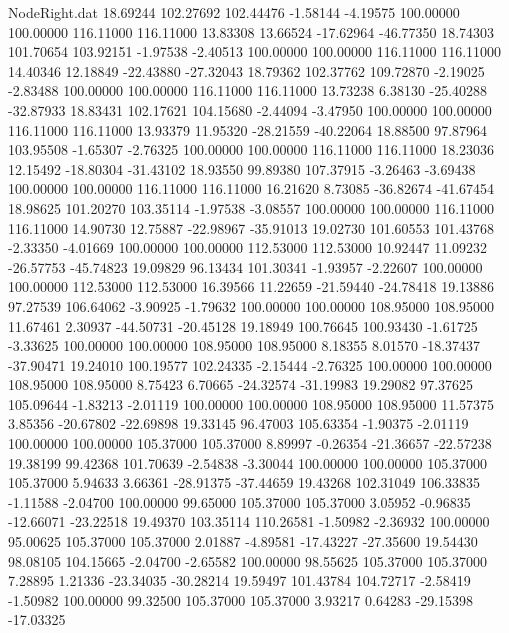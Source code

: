 \begin{filecontents}{NodeRight.dat}
  18.69244  102.27692  102.44476    -1.58144   -4.19575  100.00000  100.00000  116.11000  116.11000   13.83308   13.66524  -17.62964  -46.77350
  18.74303  101.70654  103.92151    -1.97538   -2.40513  100.00000  100.00000  116.11000  116.11000   14.40346   12.18849  -22.43880  -27.32043
  18.79362  102.37762  109.72870    -2.19025   -2.83488  100.00000  100.00000  116.11000  116.11000   13.73238    6.38130  -25.40288  -32.87933
  18.83431  102.17621  104.15680    -2.44094   -3.47950  100.00000  100.00000  116.11000  116.11000   13.93379   11.95320  -28.21559  -40.22064
  18.88500   97.87964  103.95508    -1.65307   -2.76325  100.00000  100.00000  116.11000  116.11000   18.23036   12.15492  -18.80304  -31.43102
  18.93550   99.89380  107.37915    -3.26463   -3.69438  100.00000  100.00000  116.11000  116.11000   16.21620    8.73085  -36.82674  -41.67454
  18.98625  101.20270  103.35114    -1.97538   -3.08557  100.00000  100.00000  116.11000  116.11000   14.90730   12.75887  -22.98967  -35.91013
  19.02730  101.60553  101.43768    -2.33350   -4.01669  100.00000  100.00000  112.53000  112.53000   10.92447   11.09232  -26.57753  -45.74823
  19.09829   96.13434  101.30341    -1.93957   -2.22607  100.00000  100.00000  112.53000  112.53000   16.39566   11.22659  -21.59440  -24.78418
  19.13886   97.27539  106.64062    -3.90925   -1.79632  100.00000  100.00000  108.95000  108.95000   11.67461    2.30937  -44.50731  -20.45128
  19.18949  100.76645  100.93430    -1.61725   -3.33625  100.00000  100.00000  108.95000  108.95000    8.18355    8.01570  -18.37437  -37.90471
  19.24010  100.19577  102.24335    -2.15444   -2.76325  100.00000  100.00000  108.95000  108.95000    8.75423    6.70665  -24.32574  -31.19983
  19.29082   97.37625  105.09644    -1.83213   -2.01119  100.00000  100.00000  108.95000  108.95000   11.57375    3.85356  -20.67802  -22.69898
  19.33145   96.47003  105.63354    -1.90375   -2.01119  100.00000  100.00000  105.37000  105.37000    8.89997   -0.26354  -21.36657  -22.57238
  19.38199   99.42368  101.70639    -2.54838   -3.30044  100.00000  100.00000  105.37000  105.37000    5.94633    3.66361  -28.91375  -37.44659
  19.43268  102.31049  106.33835    -1.11588   -2.04700  100.00000   99.65000  105.37000  105.37000    3.05952   -0.96835  -12.66071  -23.22518
  19.49370  103.35114  110.26581    -1.50982   -2.36932  100.00000   95.00625  105.37000  105.37000    2.01887   -4.89581  -17.43227  -27.35600
  19.54430   98.08105  104.15665    -2.04700   -2.65582  100.00000   98.55625  105.37000  105.37000    7.28895    1.21336  -23.34035  -30.28214
  19.59497  101.43784  104.72717    -2.58419   -1.50982  100.00000   99.32500  105.37000  105.37000    3.93217    0.64283  -29.15398  -17.03325

\end{filecontents}
